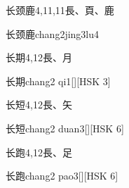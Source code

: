 \begin{entry}{长颈鹿}{4,11,11}{⾧、⾴、⿅}
  \begin{phonetics}{长颈鹿}{chang2jing3lu4}
  \end{phonetics}
\end{entry}

\begin{entry}{长期}{4,12}{⾧、⽉}
  \begin{phonetics}{长期}{chang2 qi1}[][HSK 3]
  \end{phonetics}
\end{entry}

\begin{entry}{长短}{4,12}{⾧、⽮}
  \begin{phonetics}{长短}{chang2 duan3}[][HSK 6]
  \end{phonetics}
\end{entry}

\begin{entry}{长跑}{4,12}{⾧、⾜}
  \begin{phonetics}{长跑}{chang2 pao3}[][HSK 6]
  \end{phonetics}
\end{entry}


